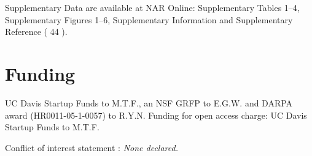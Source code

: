 \begin{refsection}
Supplementary Data are available at NAR Online: Supplementary Tables 1–4, Supplementary Figures 1–6, Supplementary Information and Supplementary Reference ( 44 ).

\section{Funding}

UC Davis Startup Funds to M.T.F., an NSF GRFP to E.G.W. and DARPA award (HR0011-05-1-0057) to R.Y.N. Funding for open access charge: UC Davis Startup Funds to M.T.F.

Conflict of interest statement : {\em None declared.}

\printbibliography[heading=subbibliography]

\end{refsection}
